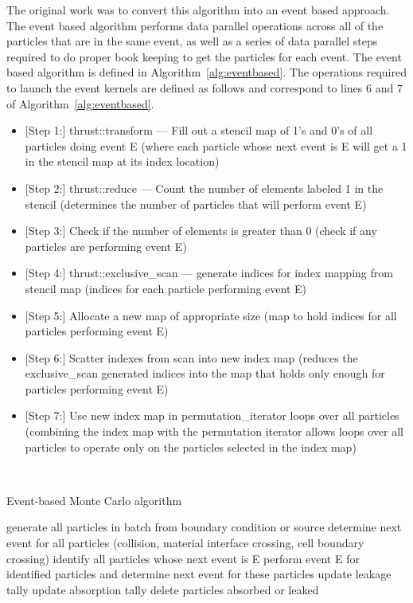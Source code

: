 %
The original work was to convert this algorithm into an event based approach.
%
The event based algorithm performs data parallel operations across all of the particles that are in the same event, as well as a series of data parallel steps required to do proper book keeping to get the particles for each event.
%
The event based algorithm is defined in Algorithm~\ref{alg:eventbased}.
%
The operations required to launch the event kernels are defined as follows and correspond to lines 6 and 7 of Algorithm~\ref{alg:eventbased}.
%
\begin{itemize}
\item{[Step 1:]} thrust::transform --- Fill out a stencil map of 1's and 0's of all particles doing event E (where each particle whose next event is E will get a 1 in the stencil map at its index location)
\item{[Step 2:]} thrust::reduce --- Count the number of elements labeled 1 in the stencil (determines the number of particles that will perform event E)
\item{[Step 3:]} Check if the number of elements is greater than 0 (check if any particles are performing event E)
\item{[Step 4:]} thrust::exclusive\_scan --- generate indices for index mapping from stencil map (indices for each particle performing event E)
\item{[Step 5:]} Allocate a new map of appropriate size (map to hold indices for all particles performing event E)
\item{[Step 6:]} Scatter indexes from scan into new index map (reduces the exclusive\_scan generated indices into the map that holds only enough for particles performing event E)
\item{[Step 7:]} Use new index map in permutation\_iterator loops over all particles (combining the index map with the permutation iterator allows loops over all particles to operate only on the particles selected in the index map)
\end{itemize}
~\cite{alpsmc1}
%

\begin{algorithm}
\DontPrintSemicolon
\caption{Event-based Monte Carlo algorithm}
\label{alg:eventbased}
{ 
    generate all particles in batch from boundary condition or source\;
    determine next event for all particles (collision, material interface crossing, cell boundary crossing)\;
    {
       {
          identify all particles whose next event is E\;
          perform event E for identified particles and determine next event for these particles\;
       }
       {
          update leakage tally\;
       }
       {
          update absorption tally\;
       }
       delete particles absorbed or leaked\;
    }
}
\end{algorithm}

